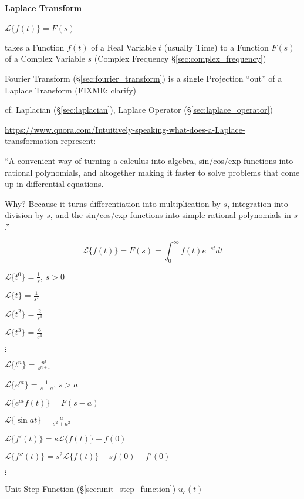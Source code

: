 \paragraph{Laplace Transform}\label{sec:laplace_transform}\hfill

$\mathcal{L}\{f(t)\} = F(s)$

takes a Function $f(t)$ of a Real Variable $t$ (usually Time) to a Function
$F(s)$ of a Complex Variable $s$ (Complex Frequency
\S\ref{sec:complex_frequency})

\fist Fourier Transform (\S\ref{sec:fourier_transform}) is a single Projection
``out'' of a Laplace Transform (FIXME: clarify)

\fist cf. Laplacian (\S\ref{sec:laplacian}), Laplace Operator
(\S\ref{sec:laplace_operator}) %

\url{https://www.quora.com/Intuitively-speaking-what-does-a-Laplace-transformation-represent}:

``A convenient way of turning a calculus into algebra, sin/cos/exp functions
into rational polynomials, and altogether making it faster to solve problems
that come up in differential equations.

Why? Because it turns differentiation into multiplication by $s$, integration
into division by $s$, and the sin/cos/exp functions into simple rational
polynomials in $s$.''

\[
  \mathcal{L} \{ f(t) \} = F(s) = \int_0^\infty f(t) e^{-st} dt
\]

$\mathcal{L}\{t^0\} = \frac{1}{s}$, $s > 0$

$\mathcal{L}\{t\} = \frac{1}{s^2}$

$\mathcal{L}\{t^2\} = \frac{2}{s^3}$

$\mathcal{L}\{t^3\} = \frac{6}{s^4}$

$\vdots$

$\mathcal{L}\{t^n\} = \frac{n!}{s^{n+1}}$

$\mathcal{L}\{e^{at}\} = \frac{1}{s-a}$, $s > a$

$\mathcal{L}\{e^{at}f(t)\} = F(s-a)$

$\mathcal{L}\{\sin at\} = \frac{a}{s^2+a^2}$

$\mathcal{L}\{ f'(t) \} = s \mathcal{L} \{f(t)\} - f(0)$

$\mathcal{L}\{ f''(t) \} = s^2 \mathcal{L} \{f(t)\} - sf(0) - f'(0)$

$\vdots$

Unit Step Function (\S\ref{sec:unit_step_function}) $u_c(t)$


